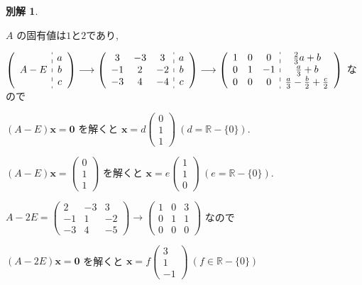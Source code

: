 \documentclass{jsarticle}
\newtheorem*{another*}{別解}
\begin{document}
\bigskip
\bigskip

\begin{another*}
\end{another*}
$A$ の固有値は$1$と$2$であり, 

$\left(\begin{array}{c:c} & a \\ A-E & b \\ & c \end{array} \right) \longrightarrow \left(\begin{array}{ccc:c} 3 & -3 & 3 & a \\ -1 & 2 & -2 & b \\ -3 & 4 & -4 & c \end{array} \right) \longrightarrow \left(\begin{array}{ccc:c} 1 & 0 & 0 & \frac{2}{3}a + b \\ 0 & 1 & -1 & \frac{a}{3} + b \\ 0 & 0 & 0 & \frac{a}{3} - \frac{b}{2} + \frac{c}{2} \end{array} \right)$ なので

$(A-E)\bm{x} = \bm{0}$ を解くと $\bm{x} = d\begin{pmatrix} 0 \\ 1 \\ 1 \end{pmatrix} \ (d = \mathbb{R} - \{0\})$.

$(A-E)\bm{x} = \begin{pmatrix} 0 \\ 1 \\ 1 \end{pmatrix}$ を解くと $\bm{x} = e\begin{pmatrix} 1 \\ 1 \\ 0 \end{pmatrix} \ (e = \mathbb{R} - \{0\})$.

$A-2E = \begin{pmatrix} 2 & -3 & 3 \\ -1 & 1 & -2 \\ -3 & 4 & -5 \end{pmatrix} \longrightarrow \begin{pmatrix} 1 & 0 & 3 \\ 0 & 1 & 1 \\ 0 & 0 & 0 \end{pmatrix}$ なので 

$(A-2E)\bm{x} = \bm{0}$ を解くと $\bm{x} = f\begin{pmatrix} 3 \\ 1 \\ -1 \end{pmatrix} \ (f \in \mathbb{R} - \{0\})$
\end{document}
